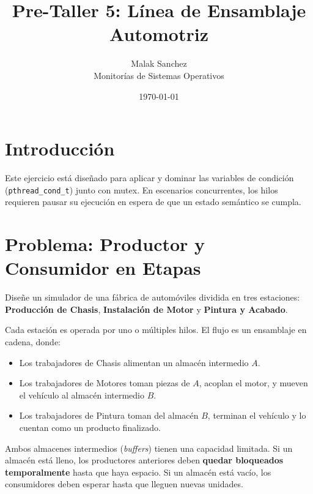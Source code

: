 \documentclass[12pt,a4paper]{article}
\title{\textbf{Pre-Taller 5: Línea de Ensamblaje Automotriz}}
\author{Malak Sanchez \\ \small Monitorías de Sistemas Operativos}
\date{\today}
\begin{document}
\maketitle

\section*{Introducción}
Este ejercicio está diseñado para aplicar y dominar las variables de condición (\texttt{pthread\_cond\_t}) junto con mutex. En escenarios concurrentes, los hilos requieren pausar su ejecución en espera de que un estado semántico se cumpla.

\section*{Problema: Productor y Consumidor en Etapas}
Diseñe un simulador de una fábrica de automóviles dividida en tres estaciones: \textbf{Producción de Chasis}, \textbf{Instalación de Motor} y \textbf{Pintura y Acabado}. 

Cada estación es operada por uno o múltiples hilos. El flujo es un ensamblaje en cadena, donde:
\begin{itemize}
    \item Los trabajadores de Chasis alimentan un almacén intermedio $A$.
    \item Los trabajadores de Motores toman piezas de $A$, acoplan el motor, y mueven el vehículo al almacén intermedio $B$.
    \item Los trabajadores de Pintura toman del almacén $B$, terminan el vehículo y lo cuentan como un producto finalizado.
\end{itemize}

Ambos almacenes intermedios (\textit{buffers}) tienen una capacidad limitada. Si un almacén está lleno, los productores anteriores deben \textbf{quedar bloqueados temporalmente} hasta que haya espacio. Si un almacén está vacío, los consumidores deben esperar hasta que lleguen nuevas unidades.

\begin{center}
\end{center}
\end{document}
